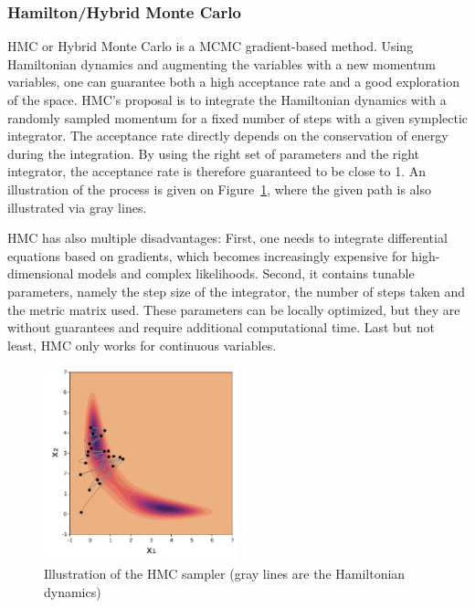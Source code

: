 \subsubsection{Hamilton/Hybrid Monte Carlo}
\label{sec:hmc}
\acf{HMC} or Hybrid Monte Carlo \cite{duane1987hybrid, betancourt2017conceptual} is a \ac{MCMC} gradient-based method.
Using Hamiltonian dynamics and augmenting the variables with a new momentum variables, one can guarantee both a high acceptance rate and a good exploration of the space.
\ac{HMC}'s proposal is to integrate the Hamiltonian dynamics with a randomly sampled momentum for a fixed number of steps with a given symplectic integrator.
The acceptance rate directly depends on the conservation of energy during the integration.
By using the right set of parameters and the right integrator, the acceptance rate is therefore guaranteed to be close to 1.
An illustration of the process is given on Figure~\ref{fig:hmc}, where the given path is also illustrated via gray lines.

\ac{HMC} has also multiple disadvantages: 
First, one needs to integrate differential equations based on gradients, which becomes increasingly expensive for high-dimensional models and complex likelihoods. 
Second, it contains tunable parameters, namely the step size of the integrator, the number of steps taken and the metric matrix used.
These parameters can be locally optimized, but they are without guarantees and require additional computational time.
Last but not least, \ac{HMC} only works for continuous variables.

\begin{figure}
    \centering
\includegraphics[width=0.5\textwidth]{./chapters/2_background/figures/hmc_sampling.pdf}
\caption{Illustration of the HMC sampler (gray lines are the Hamiltonian dynamics)}
\label{fig:hmc}
\end{figure}

